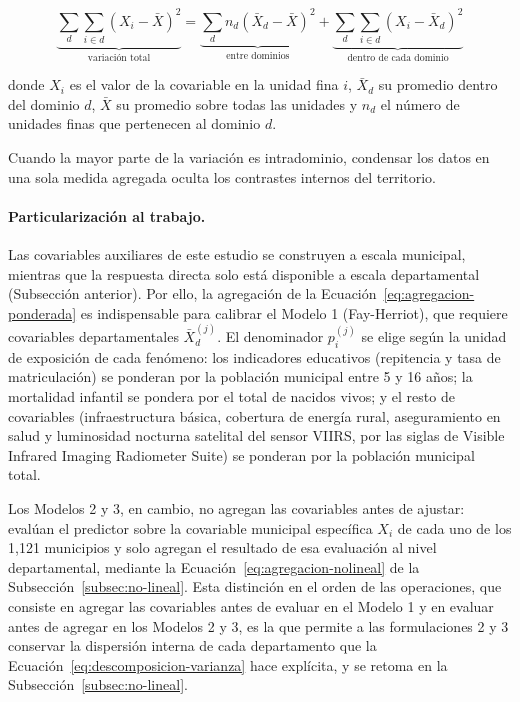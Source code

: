 \begin{equation}
    \underbrace{\sum_{d}\sum_{i \in d} (X_i - \bar{X})^2}_{\text{variación total}} =
    \underbrace{\sum_{d} n_d (\bar{X}_d - \bar{X})^2}_{\text{entre dominios}} +
    \underbrace{\sum_{d}\sum_{i \in d} (X_i - \bar{X}_d)^2}_{\text{dentro de cada dominio}}
    \label{eq:descomposicion-varianza}
\end{equation}

\noindent donde $X_i$ es el valor de la covariable en la unidad fina $i$, $\bar{X}_d$ su promedio dentro del dominio $d$, $\bar{X}$ su promedio sobre todas las unidades y $n_d$ el número de unidades finas que pertenecen al dominio $d$.

Cuando la mayor parte de la variación es intradominio, condensar los datos en una sola medida agregada oculta los contrastes internos del territorio.

\paragraph{Particularización al trabajo.}
Las covariables auxiliares de este estudio se construyen a escala municipal, mientras que la respuesta directa solo está disponible a escala departamental (Subsección anterior). Por ello, la agregación de la Ecuación~\ref{eq:agregacion-ponderada} es indispensable para calibrar el Modelo 1 (Fay-Herriot), que requiere covariables departamentales $\bar{X}_d^{(j)}$. El denominador $p_i^{(j)}$ se elige según la unidad de exposición de cada fenómeno: los indicadores educativos (repitencia y tasa de matriculación) se ponderan por la población municipal entre 5 y 16 años; la mortalidad infantil se pondera por el total de nacidos vivos; y el resto de covariables (infraestructura básica, cobertura de energía rural, aseguramiento en salud y luminosidad nocturna satelital del sensor VIIRS, por las siglas de Visible Infrared Imaging Radiometer Suite) se ponderan por la población municipal total.

Los Modelos 2 y 3, en cambio, no agregan las covariables antes de ajustar: evalúan el predictor sobre la covariable municipal específica $X_i$ de cada uno de los 1{,}121 municipios y solo agregan el resultado de esa evaluación al nivel departamental, mediante la Ecuación~\ref{eq:agregacion-nolineal} de la Subsección~\ref{subsec:no-lineal}. Esta distinción en el orden de las operaciones, que consiste en agregar las covariables antes de evaluar en el Modelo 1 y en evaluar antes de agregar en los Modelos 2 y 3, es la que permite a las formulaciones 2 y 3 conservar la dispersión interna de cada departamento que la Ecuación~\ref{eq:descomposicion-varianza} hace explícita, y se retoma en la Subsección~\ref{subsec:no-lineal}.


